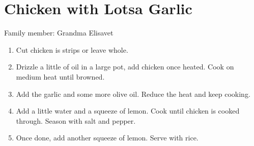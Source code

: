 \chapter{Chicken with Lotsa Garlic}
\label{ch:chickenwithgarlic}


Family member: Grandma Elisavet

\begin{enumerate}
    \item Cut chicken is strips or leave whole.
    \item Drizzle a little of oil in a large pot, add chicken once heated. Cook on medium heat until browned.
    \item Add the garlic and some more olive oil. Reduce the heat and keep cooking.
    \item Add a little water and a squeeze of lemon. Cook until chicken is cooked through. Season with salt and pepper.
    \item Once done, add another squeeze of lemon. Serve with rice.
\end{enumerate}

